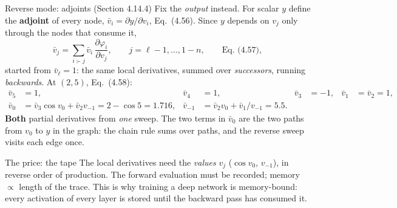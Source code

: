 \documentclass[10pt,aspectratio=169]{beamer}
\begin{document}
\begin{frame}{Reverse mode: adjoints (Section 4.14.4)}
Fix the \emph{output} instead.  For scalar $y$ define the \textbf{adjoint} of
every node, $\bar v_i=\partial y/\partial v_i$, Eq.~(4.56).  Since $y$
depends on $v_j$ only through the nodes that consume it,
\[
  \bar v_j=\sum_{i\succ j}\bar v_i\,\frac{\partial\varphi_i}{\partial v_j},
  \qquad j=\ell-1,\dots,1-n,\qquad\text{Eq.~(4.57)},
\]
started from $\bar v_\ell=1$: the same local derivatives, summed over
\emph{successors}, running \emph{backwards}.  At $(2,5)$, Eq.~(4.58):
\[
\begin{aligned}
  \bar v_5&=1,& \bar v_4&=1,& \bar v_3&=-1,& \bar v_1&=\bar v_2=1,\\
  \bar v_0&=\bar v_3\cos v_0+\bar v_2v_{-1}=2-\cos5=1.716,&
  \bar v_{-1}&=\bar v_2v_0+\bar v_1/v_{-1}=5.5 .
\end{aligned}
\]
\textbf{Both} partial derivatives from \emph{one} sweep.  The two terms in
$\bar v_0$ are the two paths from $v_0$ to $y$ in the graph: the chain rule
sums over paths, and the reverse sweep visits each edge once.
\vspace{3pt}
\begin{block}{The price: the tape}
The local derivatives need the \emph{values} $v_j$ ($\cos v_0$, $v_{-1}$),
in reverse order of production.  The forward evaluation must be recorded;
memory $\propto$ length of the trace.  This is why training a deep network is
memory-bound: every activation of every layer is stored until the backward
pass has consumed it.
\end{block}
\end{frame}
\end{document}
